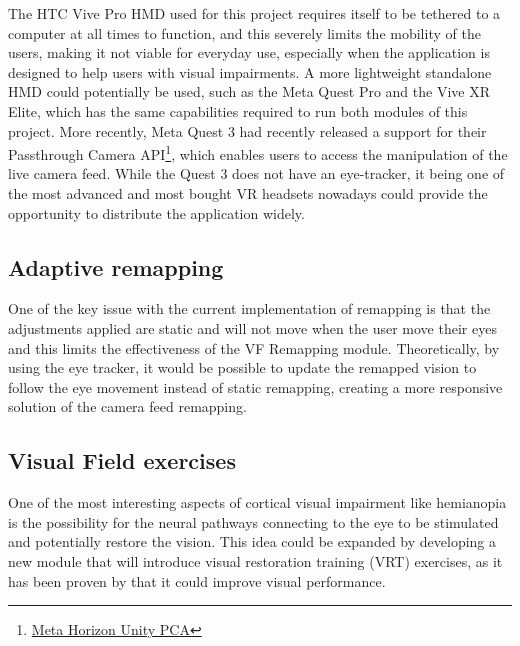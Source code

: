 \documentclass{l4proj}
\begin{document}
The HTC Vive Pro HMD used for this project requires itself to be tethered to a computer at all times to function, and this severely limits the mobility of the users, making it not viable for everyday use, especially when the application is designed to help users with visual impairments. A more lightweight standalone HMD could potentially be used, such as the Meta Quest Pro and the Vive XR Elite, which has the same capabilities required to run both modules of this project. More recently, Meta Quest 3 had recently released a support for their Passthrough Camera API\footnote{\href{https://developers.meta.com/horizon/documentation/unity/unity-pca-documentation}{Meta Horizon Unity PCA}}, which enables users to access the manipulation of the live camera feed. While the Quest 3 does not have an eye-tracker, it being one of the most advanced and most bought VR headsets nowadays could provide the opportunity to distribute the application widely. 

\subsection{Adaptive remapping}
One of the key issue with the current implementation of remapping is that the adjustments applied are static and will not move when the user move their eyes and this limits the effectiveness of the VF Remapping module. Theoretically, by using the eye tracker, it would be possible to update the remapped vision to follow the eye movement instead of static remapping, creating a more responsive solution of the camera feed remapping.

\subsection{Visual Field exercises}
One of the most interesting aspects of cortical visual impairment like hemianopia is the possibility for the neural pathways connecting to the eye to be stimulated and potentially restore the vision. This idea could be expanded by developing a new module that will introduce visual restoration training (VRT) exercises, as it has been proven by \cite{Gall2012ReadingDefects} that it could improve visual performance.

%
% 
\end{document}
